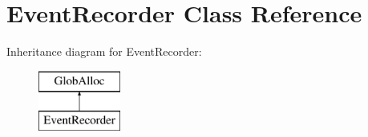 \hypertarget{classEventRecorder}{\section{Event\-Recorder Class Reference}
\label{classEventRecorder}
}
Inheritance diagram for Event\-Recorder\-:\begin{figure}[H]
\begin{center}
\leavevmode
\includegraphics[height=2.000000cm]{classEventRecorder}
\end{center}
\end{figure}
